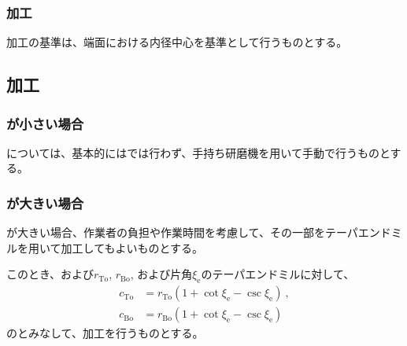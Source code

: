 \subsubsection{\EndFaceInRoundChamfer 加工}
\nameEndFaceInRoundChamfer 加工の基準は、端面における内径中心を基準として行うものとする。


\subsection{\EndFaceOutRoundChamfer 加工}

\subsubsection{\EndFaceOutRoundChamferRadius が小さい場合}
\EndFaceOutRoundChamfer については、基本的には\MMC では行わず、手持ち研磨機を用いて手動で行うものとする。

\subsubsection{\EndFaceOutRoundChamferRadius が大きい場合}
\EndFaceOutRoundChamferRadius が大きい場合、作業者の負担や作業時間を考慮して、その一部をテーパエンドミルを用いて加工してもよいものとする。

このとき、\TopEndFaceOutRoundChamferRadius および\BottomEndFaceOutRoundChamferRadius$r_\mathrm{To}$, $r_\mathrm{Bo}$, および片角$\xi_\mathrm e$のテーパエンドミルに対して、
\begin{align*}
  c_\mathrm{To} &= r_\mathrm{To}\left(1+\cot\xi_\mathrm e-\csc\xi_\mathrm e\right)\ ,\\
  c_\mathrm{Bo} &= r_\mathrm{Bo}\left(1+\cot\xi_\mathrm e-\csc\xi_\mathrm e\right)
\end{align*}
の\EndFaceOutChamferLength とみなして、\nameEndFaceOutChamfer 加工を行うものとする。



